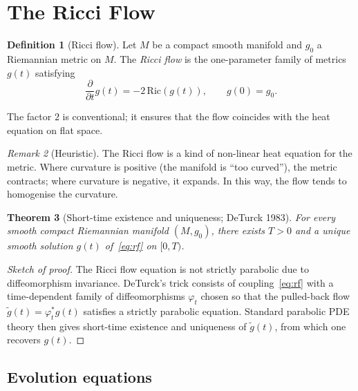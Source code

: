 \documentclass[12pt,a4paper]{amsart}
\newtheorem{theorem}{Theorem}[section]
\theoremstyle{definition}
\newtheorem{definition}[theorem]{Definition}
\theoremstyle{remark}
\newtheorem{remark}[theorem]{Remark}
\newcommand{\Ric}{\mathrm{Ric}}
\begin{document}
\section{The Ricci Flow}
\label{sec:rf}

\begin{definition}[Ricci flow]
Let $M$ be a compact smooth manifold and $g_0$ a Riemannian metric on $M$.
The \emph{Ricci flow} is the one-parameter family of metrics $g(t)$ satisfying
\begin{equation}
  \label{eq:rf}
  \frac{\partial}{\partial t} g(t) = -2\,\Ric(g(t)), \qquad g(0) = g_0.
\end{equation}
\end{definition}

The factor $2$ is conventional; it ensures that the flow coincides with the
heat equation on flat space.

\begin{remark}[Heuristic]
The Ricci flow is a kind of non-linear heat equation for the metric.  Where
curvature is positive (the manifold is ``too curved''), the metric contracts;
where curvature is negative, it expands.  In this way, the flow tends to
homogenise the curvature.
\end{remark}

\begin{theorem}[Short-time existence and uniqueness; DeTurck 1983]
\label{thm:ste}
For every smooth compact Riemannian manifold $(M,g_0)$, there exists
$T > 0$ and a unique smooth solution $g(t)$ of~\eqref{eq:rf} on $[0,T)$.
\end{theorem}

\begin{proof}[Sketch of proof]
The Ricci flow equation is not strictly parabolic due to diffeomorphism
invariance.  DeTurck's trick consists of coupling~\eqref{eq:rf} with a
time-dependent family of diffeomorphisms $\varphi_t$ chosen so that the
pulled-back flow $\tilde g(t) = \varphi_t^* g(t)$ satisfies a strictly
parabolic equation.  Standard parabolic PDE theory then gives short-time
existence and uniqueness of $\tilde g(t)$, from which one recovers $g(t)$.
\end{proof}

\subsection{Evolution equations}
\end{document}
